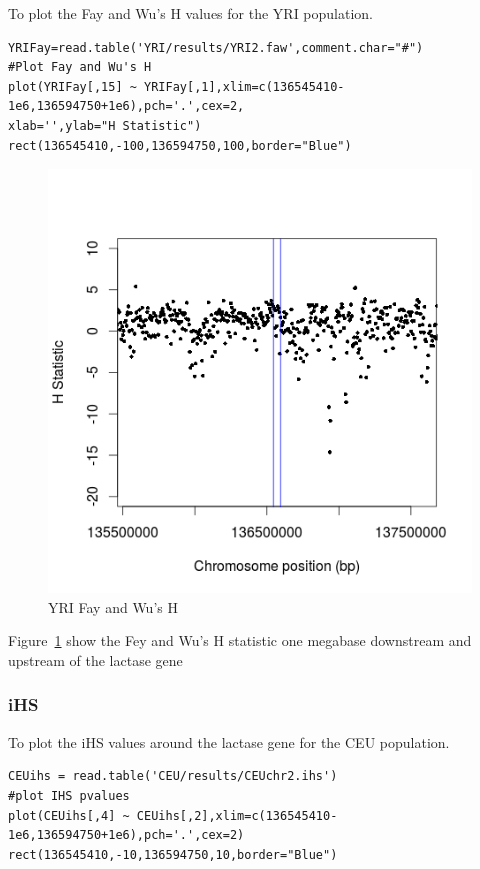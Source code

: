 \documentclass[a4paper,10pt]{article}
\begin{document}
To plot the Fay and Wu's H values for the YRI population.\\
\begin{verbatim}
YRIFay=read.table('YRI/results/YRI2.faw',comment.char="#")
#Plot Fay and Wu's H
plot(YRIFay[,15] ~ YRIFay[,1],xlim=c(136545410-1e6,136594750+1e6),pch='.',cex=2,
xlab='',ylab="H Statistic")
rect(136545410,-100,136594750,100,border="Blue") 
\end{verbatim}
\begin{figure}
\centering
\includegraphics{pictures/YRIFay.png}
\caption{YRI Fay and Wu's H}
\label{fig:fayyri}
\end{figure}
Figure~\ref{fig:fayyri} show the Fey and Wu's H statistic one megabase downstream and upstream of the lactase gene

\subsubsection{iHS}
To plot the iHS values around the lactase gene for the CEU population.\\
\begin{verbatim}
CEUihs = read.table('CEU/results/CEUchr2.ihs')
#plot IHS pvalues
plot(CEUihs[,4] ~ CEUihs[,2],xlim=c(136545410-1e6,136594750+1e6),pch='.',cex=2)
rect(136545410,-10,136594750,10,border="Blue") 
\end{verbatim}
\end{document}
